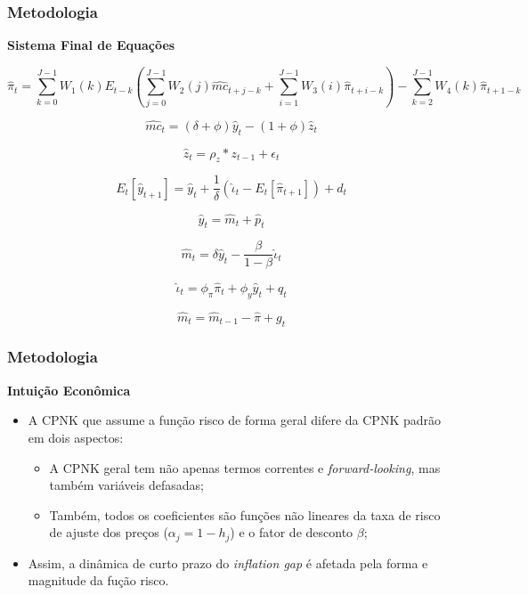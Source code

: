 \documentclass[aspectratio=169]{beamer}
\begin{document}
\begin{frame}[shrink=20]\frametitle{Metodologia}
  \textbf{Sistema Final de Equações}

\begin{equation}\label{eq23en03}
{\hat{\pi}}_{t}=\sum_{k=0}^{J-1}{{W}_{1}(k)}{E}_{t-k}(\sum_{j=0}^{J-1}{{W}_{2}(j){\hat{mc}}_{t+j-k}+\sum_{i=1}^{J-1}{{W}_{3}(i){\hat{\pi}}_{t+i-k}}})-\sum_{k=2}^{J-1}{{W}_{4}(k){\hat{\pi}}_{t+1-k}} 
\end{equation}

\begin{equation}\label{eq24en03}
{\hat{mc}}_{t}=(\delta +\phi){\hat{y}}_{t}-(1+\phi){\hat{z}}_{t}
\end{equation}

\begin{equation}\label{eq25en03}
{\hat{z}}_{t}={\rho}_{z}\ast {z}_{t-1}+{\epsilon}_{t}
\end{equation}

\begin{equation}\label{eq26en03}
{E}_{t}[{\hat{y}}_{t+1}]={\hat{y}}_{t}+\frac{1}{\delta}({\hat{\iota}}_{t}-{E}_{t}[{\hat{\pi}}_{t+1}])+{d}_{t}
\end{equation}

\begin{equation}\label{eq27en03}
{\hat{y}}_{t} = \hat{m}_{t}+\hat{p}_{t}
\end{equation}

\begin{equation}\label{eq28en03}
\hat{m}_{t} = {\delta}{\hat{y}}_{t} - \frac{\beta}{1- \beta}{\hat{\iota}_{t}}
\end{equation}

\begin{equation}\label{eq29en03}
{\hat{\iota}}_{t}={\phi}_{\pi}{\hat{\pi}}_{t}+{\phi}_{y}{\hat{y}}_{t}+{q}_{t}
\end{equation}

\begin{equation}\label{eq30en03}
\hat{m}_{t} = \hat{m}_{t-1}-{\hat{\pi}}+g_{t}
\end{equation}
\end{frame}

\begin{frame}\frametitle{Metodologia}
  \textbf{Intuição Econômica}
  \begin{itemize}
  \item A CPNK que assume a função risco de forma geral difere da CPNK padrão em dois aspectos:
    \begin{itemize}
    \item A CPNK geral tem não apenas termos correntes e \emph{forward-looking}, mas também variáveis defasadas;
    \item Também, todos os coeficientes são funções não lineares da taxa de risco de ajuste dos preços ($\alpha_{j}=1-h_{j}$) e o fator de desconto $\beta$;
    \end{itemize}
  \item Assim, a dinâmica de curto prazo do \emph{inflation gap} é afetada pela forma e magnitude da fução risco.
  \end{itemize}
\end{frame}
\end{document}

